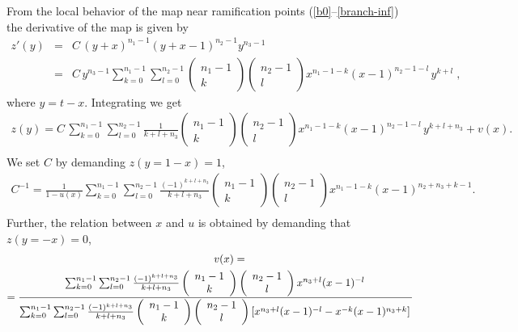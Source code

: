 \documentclass[letterpaper]{JHEP3}
\def\be{\begin{equation}}
\def\ee{\end{equation}}
\def\be{\begin{eqnarray}}
\def\ee{\end{eqnarray}}
\begin{document}
 From the local behavior of
the map near ramification points (\ref{b0}--\ref{branch-inf}) the derivative of the map is given by
\be
z'(y)&=&C\, (y+x)^{n_1-1}(y+x-1)^{n_2-1} y^{n_3-1}\\&=&C\, y^{n_3-1} \sum_{k=0}^{n_1-1}\sum_{l=0}^{n_2-1}
\left(
\begin{array}{c}
n_1-1  \\
k
\end{array}
\right)
\left(
\begin{array}{c}
n_2-1  \\
l
\end{array}
\right)
x^{n_1-1-k}(x-1)^{n_2-1-l}\, y^{k+l}\;,\nonumber
\ee where $y=t-x$. Integrating we get
\be
z(y)=
C\, \sum_{k=0}^{n_1-1}\sum_{l=0}^{n_2-1}\frac{1}{k+l+n_3}
\left(
\begin{array}{c}
n_1-1  \\
k
\end{array}
\right)
\left(
\begin{array}{c}
n_2-1  \\
l
\end{array}
\right)
x^{n_1-1-k}(x-1)^{n_2-1-l}\, y^{k+l+n_3}+v(x).\nonumber\\
\ee
We set $C$ by demanding $z(y=1-x)=1$,
\be
C^{-1}= \frac{1}{1-u(x)}\sum_{k=0}^{n_1-1}\sum_{l=0}^{n_2-1}\frac{ (-1)^{k+l+n_3}}{k+l+n_3}
\left(
\begin{array}{c}
n_1-1  \\
k
\end{array}
\right)
\left(
\begin{array}{c}
n_2-1  \\
l
\end{array}
\right)
x^{n_1-1-k}(x-1)^{n_2+n_3+k-1}.\nonumber\\
\ee Further, the relation between $x$ and $u$ is obtained by demanding  that $z(y=-x)=0$, 
\be
\centerline{$v(x)=$}\\=\frac{
\sum_{k=0}^{n_1-1}\sum_{l=0}^{n_2-1}\frac{(-1)^{k+l+n_3}}{k+l+n_3} 
\left(
\begin{array}{c}
n_1-1  \\
k
\end{array}
\right)
\left(
\begin{array}{c}
n_2-1  \\
l
\end{array}
\right)
x^{n_3+l}(x-1)^{-l}\,}
{\sum_{k=0}^{n_1-1}\sum_{l=0}^{n_2-1}\frac{(-1)^{k+l+n_3}}{k+l+n_3} 
\left(
\begin{array}{c}
n_1-1  \\
k
\end{array}
\right)
\left(
\begin{array}{c}
n_2-1  \\
l
\end{array}
\right)
\left[x^{n_3+l}(x-1)^{-l}-x^{-k}(x-1)^{n_3+k}\right]\,
}\nonumber
\ee
\end{document}
